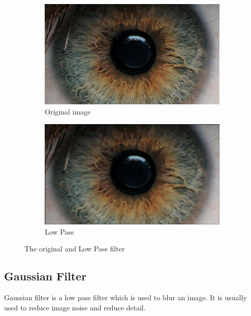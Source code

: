 \documentclass{article}
\begin{document}
%
%
\begin{figure}[H]
\centering

\begin{subfigure}{.5\textwidth}
  \centering
  \includegraphics[width=0.9\linewidth]{res/index.jpg}
  \caption{Original image}
  \label{fig:original_img}
\end{subfigure}%
\begin{subfigure}{.5\textwidth}
  \centering
  \includegraphics[width=0.9\linewidth]{res/low_pass.jpg}
  \caption{Low Pass}
  \label{fig:gray_img}
\end{subfigure}

\caption{The original and Low Pass filter}
\label{fig:result_low}
\end{figure}






\subsection{Gaussian Filter}
Gaussian filter is a low pass filter which is used to blur an image.
It is usually used to reduce image noise and reduce detail.
\end{document}
